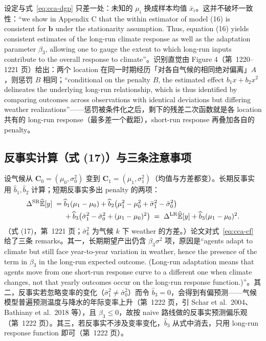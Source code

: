 设定与式~\ref{eq:cca-dgp} 只差一处：未知的 $\mu_i$ 换成样本均值 $\bar{x}_i$。这并不破坏一致性：``we show in Appendix C that the within estimator of model (16) is consistent for $\mathbf{b}$ under the stationarity assumption. Thus, equation (16) yields consistent estimates of the long-run climate response as well as the adaptation parameter $\beta_3$, allowing one to gauge the extent to which long-run inputs contribute to the overall response to climate''\citep[第~1220 页；兑现第~1214 页脚注~16「正确设定要求知道 $\mu_i$，但一致估计不要求」的承诺]{merel2021climate}。识别直觉由 Figure 4（第~1220--1221 页）给出：两个 location 在同一时期经历「对各自气候的相同绝对偏离」$A$，则惩罚 $B$ 相同；``conditional on the penalty $B$, the estimated effect $b_1 x + b_2 x^2$ delineates the underlying long-run relationship, which is thus identified by comparing outcomes across observations with identical deviations but differing weather realizations''\citep[第~1221 页]{merel2021climate}——惩罚被条件化之后，剩下的残差二次函数就是各 location 共有的 long-run response（最多差一个截距），short-run response 再叠加各自的 penalty。

\subsection{反事实计算（式 (17)）与三条注意事项}

设气候从 $\mathbf{C}_0=(\mu_0,\sigma_0^2)$ 变到 $\mathbf{C}_1=(\mu_1,\sigma_1^2)$（均值与方差都变）。长期反事实用 $\widehat{b}_1,\widehat{b}_2$ 计算；短期反事实多出 penalty 的两项：
\begin{align}
\Delta^{\mathrm{SR}}\widehat{\mathbb{E}}[y] \;=\;& \widehat{b}_1(\mu_1-\mu_0) + \widehat{b}_2\bigl(\mu_1^2-\mu_0^2+\bar{\sigma}_1^2-\bar{\sigma}_0^2\bigr) \notag\\
&+ \widehat{b}_3\bigl(\bar{\sigma}_1^2-\bar{\sigma}_0^2+(\mu_1-\mu_0)^2\bigr)
\;=\; \Delta^{\mathrm{LR}}\widehat{\mathbb{E}}[y] + \widehat{b}_3(\mu_1-\mu_0)^2 .
\label{eq:cca-cf}
\end{align}
（式 (17)，第~1221 页；$\bar{\sigma}_k^2$ 为气候 $k$ 下 weather 的方差。）论文对式~\ref{eq:cca-cf} 给了三条 remarks。其一，长期期望产出仍含 $\beta_3\sigma^2$ 项，原因是``agents adapt to climate but still face year-to-year variation in weather, hence the presence of the term in $\beta_3$ in the long-run expected outcome. (Long-run adaptation means that agents move from one short-run response curve to a different one when climate changes, not that yearly outcomes occur on the long-run response function.)''\citep[第~1221 页]{merel2021climate}。其二，反事实若忽略变率的变化（$\bar{\sigma}_1^2\neq\bar{\sigma}_0^2$）而令 $\widehat{b}_3=0$，会得到有偏预测——气候模型普遍预测温度与降水的年际变率上升（第~1222 页，引 Schar et al.~2004、Bathiany et al.~2018 等），且 $\beta_3\le 0$，故按 naive 路线做的反事实预测偏乐观（第~1222 页）。其三，若反事实不涉及变率变化，$\widehat{b}_3$ 从式中消去，只用 long-run response function 即可（第~1222 页）。

